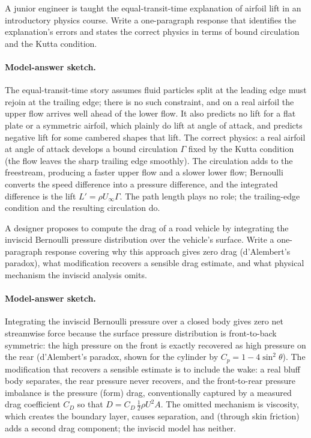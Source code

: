 \begin{exercise}
A junior engineer is taught the equal-transit-time explanation of
airfoil lift in an introductory physics course. Write a
one-paragraph response that identifies the explanation's errors
and states the correct physics in terms of bound circulation and
the Kutta condition.

\paragraph{Model-answer sketch.} The equal-transit-time story assumes
fluid particles split at the leading edge must rejoin at the trailing
edge; there is no such constraint, and on a real airfoil the upper
flow arrives well ahead of the lower flow. It also predicts no lift
for a flat plate or a symmetric airfoil, which plainly do lift at
angle of attack, and predicts negative lift for some cambered shapes
that lift. The correct physics: a real airfoil at angle of attack
develops a bound circulation $\Gamma$ fixed by the Kutta condition
(the flow leaves the sharp trailing edge smoothly). The circulation
adds to the freestream, producing a faster upper flow and a slower
lower flow; Bernoulli converts the speed difference into a pressure
difference, and the integrated difference is the lift $L' = \rho
U_\infty\Gamma$. The path length plays no role; the trailing-edge
condition and the resulting circulation do.
\end{exercise}

\begin{exercise}
A designer proposes to compute the drag of a road vehicle by
integrating the inviscid Bernoulli pressure distribution over the
vehicle's surface. Write a one-paragraph response covering why
this approach gives zero drag (d'Alembert's paradox), what
modification recovers a sensible drag estimate, and what physical
mechanism the inviscid analysis omits.

\paragraph{Model-answer sketch.} Integrating the inviscid Bernoulli
pressure over a closed body gives zero net streamwise force because
the surface pressure distribution is front-to-back symmetric: the
high pressure on the front is exactly recovered as high pressure on
the rear (d'Alembert's paradox, shown for the cylinder by $C_p = 1 -
4\sin^2\theta$). The modification that recovers a sensible estimate is
to include the wake: a real bluff body separates, the rear pressure
never recovers, and the front-to-rear pressure imbalance is the
pressure (form) drag, conventionally captured by a measured drag
coefficient $C_D$ so that $D = C_D\,\tfrac12\rho U^2 A$. The omitted
mechanism is viscosity, which creates the boundary layer, causes
separation, and (through skin friction) adds a second drag component;
the inviscid model has neither.
\end{exercise}

